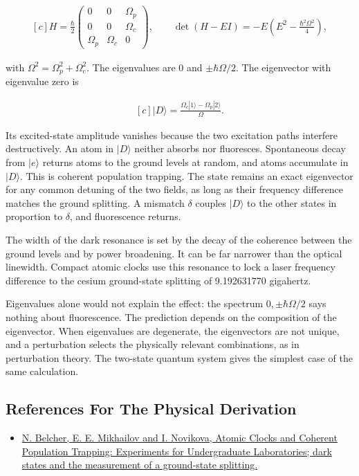 \documentclass[11pt,oneside]{book}
\newenvironment{centeredalign}{\[\begin{gathered}[c]}{\end{gathered}\]}
\begin{document}
\begin{centeredalign}
H=\frac\hbar2\begin{pmatrix}0&0&\Omega_p\\0&0&\Omega_c\\ \Omega_p&\Omega_c&0\end{pmatrix},\qquad
\det(H-EI)=-E\left(E^2-\frac{\hbar^2\Omega^2}{4}\right),
\end{centeredalign}

with \(\Omega^2=\Omega_p^2+\Omega_c^2\). The eigenvalues are \(0\) and \(\pm\hbar\Omega/2\). The eigenvector with eigenvalue zero is

\begin{centeredalign}
|D\rangle=\frac{\Omega_c|1\rangle-\Omega_p|2\rangle}{\Omega}.
\end{centeredalign}

Its excited-state amplitude vanishes because the two excitation paths interfere destructively. An atom in \(|D\rangle\) neither absorbs nor fluoresces. Spontaneous decay from \(|e\rangle\) returns atoms to the ground levels at random, and atoms accumulate in \(|D\rangle\). This is coherent population trapping. The state remains an exact eigenvector for any common detuning of the two fields, as long as their frequency difference matches the ground splitting. A mismatch \(\delta\) couples \(|D\rangle\) to the other states in proportion to \(\delta\), and fluorescence returns.

The width of the dark resonance is set by the decay of the coherence between the ground levels and by power broadening. It can be far narrower than the optical linewidth. Compact atomic clocks use this resonance to lock a laser frequency difference to the cesium ground-state splitting of 9.192631770 gigahertz.

Eigenvalues alone would not explain the effect: the spectrum \(0,\pm\hbar\Omega/2\) says nothing about fluorescence. The prediction depends on the composition of the eigenvector. When eigenvalues are degenerate, the eigenvectors are not unique, and a perturbation selects the physically relevant combinations, as in perturbation theory. The two-state quantum system gives the simplest case of the same calculation.

\subsection*{References For The Physical Derivation}
\begin{itemize}
\item \href{https://arxiv.org/abs/0810.2071}{N. Belcher, E. E. Mikhailov and I. Novikova, Atomic Clocks and Coherent Population Trapping: Experiments for Undergraduate Laboratories; dark states and the measurement of a ground-state splitting.}
\end{itemize}
\end{document}
